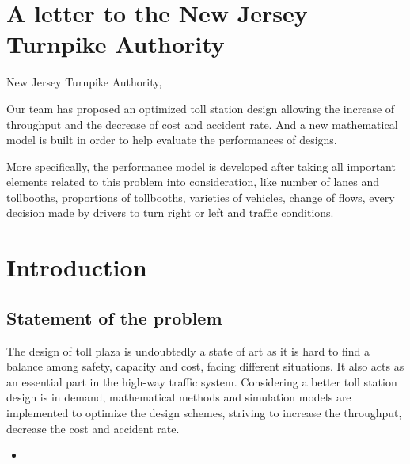 \documentclass{mcmthesis}
\begin{document}
\section{A letter to the New Jersey Turnpike Authority}


New Jersey Turnpike Authority,

Our team has proposed an optimized toll station design allowing the increase of throughput and the decrease of cost and accident rate. And a new mathematical model is built in order to help evaluate the performances of designs. 

More specifically, the performance model is developed after taking all important elements related to this problem into consideration, like number of lanes and tollbooths, proportions of tollbooths, varieties of vehicles, change of flows, every decision made by drivers to turn right or left and traffic conditions. 



\section{Introduction}

\subsection{Statement of the problem}

The design of toll plaza is undoubtedly a state of art as it is hard to find a balance among safety, capacity and cost, facing different situations. It also acts as an essential part in the high-way traffic system. Considering a better toll station design is in demand, mathematical methods and simulation models are implemented to optimize the design schemes, striving to increase the throughput, decrease the cost and accident rate.



\begin{itemize}

\item 
\end{itemize}







\begin{Theorem} \label{thm:latex}

\end{Theorem}

\begin{Lemma} \label{thm:tex}

\end{Lemma}
\end{document}
